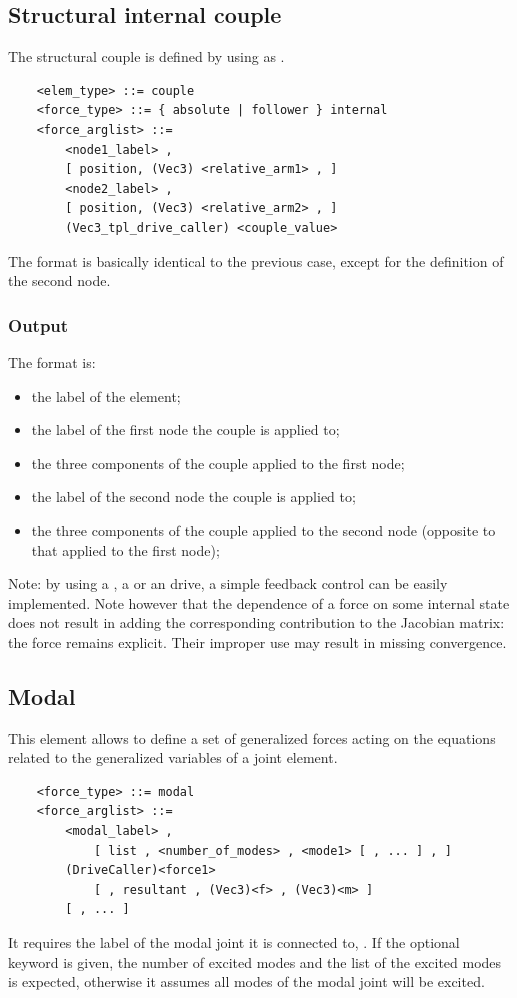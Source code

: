\subsection{Structural internal couple}
\label{sec:EL:FORCE:STRUCTURAL:INTERNAL_COUPLE}
The structural couple is defined by using  as .
\begin{verbatim}
    <elem_type> ::= couple
    <force_type> ::= { absolute | follower } internal
    <force_arglist> ::=
        <node1_label> ,
        [ position, (Vec3) <relative_arm1> , ]
        <node2_label> ,
        [ position, (Vec3) <relative_arm2> , ]
        (Vec3_tpl_drive_caller) <couple_value>
\end{verbatim}
The format is basically identical to the previous case,
except for the definition of the second node.

\subsubsection{Output}
The format is:
\begin{itemize}
    \item the label of the element;
    \item the label of the first node the couple is applied to;
    \item the three components of the couple applied to the first node;
    \item the label of the second node the couple is applied to;
    \item the three components of the couple applied to the second node
	  (opposite to that applied to the first node);
\end{itemize}

\bigskip
Note: by using a , a  or an  drive,
a simple feedback control can be easily implemented.
Note however that the dependence of a force on some internal state
does not result in adding the corresponding contribution 
to the Jacobian matrix: the force remains explicit.
Their improper use may result in missing convergence.

\subsection{Modal}
\label{sec:EL:FORCE:MODAL}
This element allows to define a set of generalized forces
acting on the equations related to the generalized variables
of a  joint element.
\begin{verbatim}
    <force_type> ::= modal
    <force_arglist> ::=
        <modal_label> ,
            [ list , <number_of_modes> , <mode1> [ , ... ] , ]
        (DriveCaller)<force1>
            [ , resultant , (Vec3)<f> , (Vec3)<m> ]
        [ , ... ]
\end{verbatim}
It requires the label of the modal joint it is connected to,
.
If the optional keyword  is given, the number of excited modes
 and the list of the excited modes is expected,
otherwise it assumes all modes of the  modal joint
will be excited.

